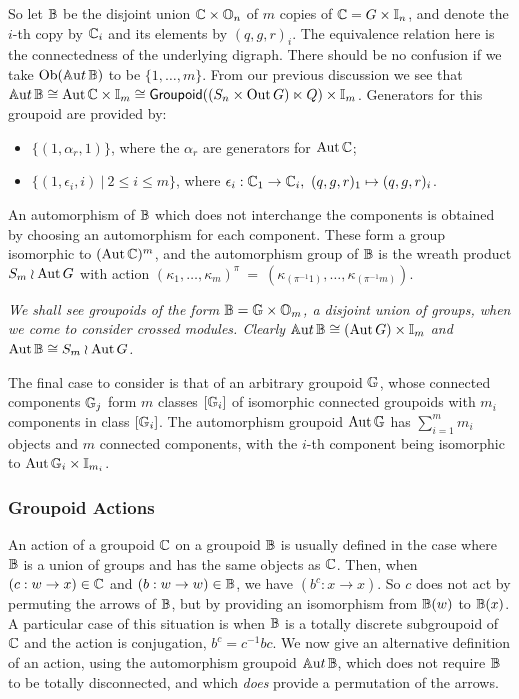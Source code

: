 So let $\mathbb{B}$ be the disjoint union $\mathbb{C} \times \mathbb{O}_n$ 
of $m$ copies of $\mathbb{C} = G \times \mathbb{I}_n$, 
and denote the $i$-th copy by $\mathbb{C}_i$ and its elements by $(q,g,r)_i$. 
The equivalence relation here is the connectedness of the underlying digraph. 
There should be no confusion if we take $\mathrm{Ob}(\mathbb{A}{\mathrm ut}\,\mathbb{B})$ 
to be $\{1,\ldots,m\}$. 
From our previous discussion we see that 
$\mathbb{A}{\mathrm ut}\,\mathbb{B} \cong \mathrm{Aut}\,\mathbb{C} \times \mathbb{I}_m 
              \cong {\sf Groupoid}((S_n \times \mathrm{Out}\,G) \ltimes Q) \times \mathbb{I}_m$. 
Generators for this groupoid are provided by: 
\begin{itemize}
\item
$\{(1,\alpha_r,1)\}$, where the $\alpha_r$ are generators for $\mathrm{Aut}\,\mathbb{C}$; 
\item
$\{(1,\epsilon_i,i) ~|~ 2 \leqslant i \leqslant m\}$, 
where $\epsilon_i : \mathbb{C}_1 \to \mathbb{C}_i,~ (q,g,r)_1 \mapsto (q,g,r)_i$. 
\end{itemize}

An automorphism of $\mathbb{B}$ which does not interchange the components 
is obtained by choosing an automorphism for each component.
These form a group isomorphic to $(\mathrm{Aut}\,\mathbb{C})^m$, 
and the automorphism group of $\mathbb{B}$ is the wreath product 
$S_m \wr \mathrm{Aut}\,G$ with action 
$(\kappa_1,\ldots,\kappa_m)^{\pi} ~=~ 
 (\kappa_{(\pi^{-1}1)},\ldots,\kappa_{(\pi^{-1}m)})$. 

\begin{example}
\emph{We shall see groupoids of the form $\mathbb{B} = \mathbb{G} \times \mathbb{O}_m$, 
a disjoint union of groups, when we come to consider crossed modules. 
Clearly $\mathbb{A}{\mathrm ut}\,\mathbb{B} \cong (\mathrm{Aut}\,G) \times \mathbb{I}_m$ 
and $\mathrm{Aut}\,\mathbb{B} \cong S_m \wr \mathrm{Aut}\,G$. 
}\end{example} 

\bigskip 
The final case to consider is that of an arbitrary groupoid $\mathbb{G}$, 
whose connected components $\mathbb{G}_j$ form $m$ classes $[\mathbb{G}_i]$ of 
isomorphic connected groupoids with $m_i$ components in class $[\mathbb{G}_i]$. 
The automorphism groupoid $\mathrm{Aut}\,\mathbb{G}$ has $\sum_{i=1}^m m_i$ objects 
and $m$ connected components, with the $i$-th component being isomorphic 
to $\mathrm{Aut}\,\mathbb{G}_i \times \mathbb{I}_{m_i}$. 

\subsubsection{Groupoid Actions}  \label{subsect:gpd-act}

An action of a groupoid $\mathbb{C}$ on a groupoid $\mathbb{B}$ 
is usually defined in the case where $\mathbb{B}$ is a union of groups 
and has the same objects as $\mathbb{C}$. 
Then, when $(c : w \to x) \in \mathbb{C}$ and $(b : w \to w) \in \mathbb{B}$, 
we have $(b^c : x \to x)$. 
So $c$ does not act by permuting the arrows of $\mathbb{B}$, 
but by providing an isomorphism from $\mathbb{B}(w)$ to $\mathbb{B}(x)$. 
A particular case of this situation is when $\mathbb{B}$ is a totally 
discrete subgroupoid of $\mathbb{C}$ and the action is conjugation, 
$b^c = c^{-1}bc$. 
We now give an alternative definition of an action, 
using the automorphism groupoid $\mathbb{A}{\mathrm ut}\,\mathbb{B}$, 
which does not require $\mathbb{B}$ to be totally disconnected, 
and which \emph{does} provide a permutation of the arrows. 

